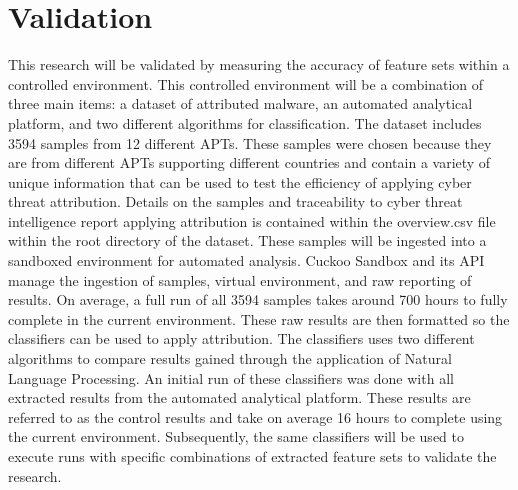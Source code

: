 \documentclass[12pt]{report}
\begin{document}

\section{Validation}
This research will be validated by measuring the accuracy of feature sets within a controlled environment.  This controlled environment will be a combination of three main items: a dataset of attributed malware, an automated analytical platform, and two different algorithms for classification.  The dataset includes 3594 samples from 12 different APTs. \cite{APTMalware2022}  These samples were chosen because they are from different APTs supporting different countries and contain a variety of unique information that can be used to test the efficiency of applying cyber threat attribution.  Details on the samples and traceability to cyber threat intelligence report applying attribution is contained within the overview.csv file within the root directory of the dataset.  These samples will be ingested into a sandboxed environment for automated analysis.  Cuckoo Sandbox and its API manage the ingestion of samples, virtual environment, and raw reporting of results.  On average, a full run of all 3594 samples takes around 700 hours to fully complete in the current environment.  These raw results are then formatted so the classifiers can be used to apply attribution.  The classifiers uses two different algorithms to compare results gained through the application of Natural Language Processing.  An initial run of these classifiers was done with all extracted results from the automated analytical platform.  These results are referred to as the control results and take on average 16 hours to complete using the current environment.  Subsequently, the same classifiers will be used to execute runs with specific combinations of extracted feature sets to validate the research. 
\end{document}
